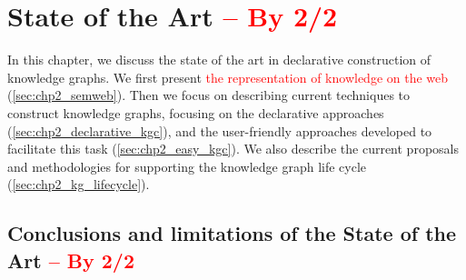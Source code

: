 \chapter{State of the Art \textcolor{red}{-- By 2/2}}
\label{chapter:sota}

In this chapter, we discuss the state of the art in declarative construction of knowledge graphs. We first present \textcolor{red}{the representation of knowledge on the web} (\cref{sec:chp2_semweb}). Then we focus on describing current techniques to construct knowledge graphs, focusing on the declarative approaches (\cref{sec:chp2_declarative_kgc}), and the user-friendly approaches developed to facilitate this task (\cref{sec:chp2_easy_kgc}). We also describe the current proposals and methodologies for supporting the knowledge graph life cycle  (\cref{sec:chp2_kg_lifecycle}).











\section{Conclusions and limitations of the State of the Art \textcolor{red}{-- By 2/2}}